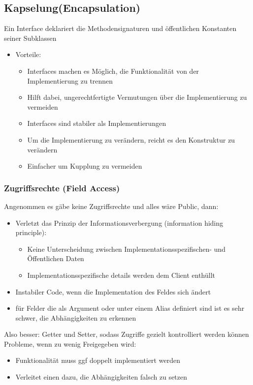 \documentclass[ngerman,color=3b]{tuda_summary}
\begin{document}
\subsection{Kapselung(Encapsulation)}
\begin{definition}
    Ein Interface deklariert die Methodensignaturen und öffentlichen Konstanten seiner Subklassen
\end{definition}
\begin{itemize}
    \item Vorteile:\begin{itemize}
              \item Interfaces machen es Möglich, die Funktionalität von der Implementierung zu trennen
              \item Hilft dabei, ungerechtfertigte Vermutungen über die Implementierung zu vermeiden
              \item Interfaces sind stabiler als Implementierungen
              \item Um die Implementierung zu verändern, reicht es den Konstruktur zu verändern
              \item Einfacher um Kupplung zu vermeiden
          \end{itemize}
\end{itemize}
\clearpage
\subsubsection{Zugriffsrechte (Field Access)}
Angenommen es gäbe keine Zugriffsrechte und alles wäre Public, dann:
\begin{itemize}
    \item Verletzt das Prinzip der Informationsverbergung (information hiding principle):\begin{itemize}
              \item Keine Unterscheidung zwischen Implementationsspezifischen- und Öffentlichen Daten
              \item Implementationsspezifische details werden dem Client enthüllt
          \end{itemize}
    \item Instabiler Code, wenn die Implementation des Feldes sich ändert
    \item für Felder die als Argument oder unter einem Alias definiert sind ist es sehr schwer, die Abhängigkeiten zu erkennen
\end{itemize}
Also besser: Getter und Setter, sodass Zugriffe gezielt kontrolliert werden können
Probleme, wenn zu wenig Freigegeben wird:\begin{itemize}
    \item Funktionalität muss ggf doppelt implementiert werden
    \item Verleitet einen dazu, die Abhängigkeiten falsch zu setzen
\end{itemize}
\end{document}
